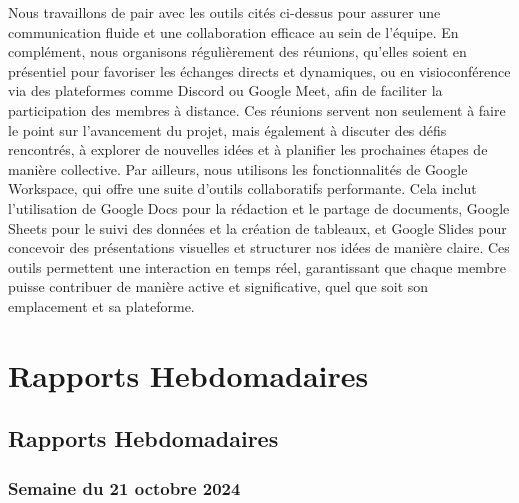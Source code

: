 \documentclass{report}
\begin{document}
Nous travaillons de pair avec les outils cités ci-dessus pour assurer une communication fluide et une collaboration efficace au sein de l'équipe. En complément, nous organisons régulièrement des réunions, qu'elles soient en présentiel pour favoriser les échanges directs et dynamiques, ou en visioconférence via des plateformes comme Discord ou Google Meet, afin de faciliter la participation des membres à distance. Ces réunions servent non seulement à faire le point sur l'avancement du projet, mais également à discuter des défis rencontrés, à explorer de nouvelles idées et à planifier les prochaines étapes de manière collective. Par ailleurs, nous utilisons les fonctionnalités de Google Workspace, qui offre une suite d'outils collaboratifs performante. Cela inclut l'utilisation de Google Docs pour la rédaction et le partage de documents, Google Sheets pour le suivi des données et la création de tableaux, et Google Slides pour concevoir des présentations visuelles et structurer nos idées de manière claire. Ces outils permettent une interaction en temps réel, garantissant que chaque membre puisse contribuer de manière active et significative, quel que soit son emplacement et sa plateforme.

\part{Rapports Hebdomadaires}
\chapter{Rapports Hebdomadaires}


\section{Semaine du 21 octobre 2024}
\end{document}

